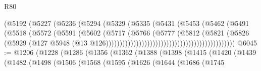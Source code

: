 \begin{lexlean}{R80}
\begin{coremodule}
                                                    (@5192
                                                      (@5227
                                                        (@5236
                                                          (@5294
                                                            (@5329
                                                              (@5335
                                                                (@5431
                                                                  (@5453
                                                                    (@5462
                                                                      (@5491
                                                                        (@5518
                                                                          (@5572
                                                                            (@5591
                                                                              (@5602
                                                                                (@5717
                                                                                  (@5766
                                                                                    (@5777
                                                                                      (@5812
                                                                                        (@5821
                                                                                          (@5826
                                                                                            (@5929
                                                                                              (@127
                                                                                                @5948
                                                                                                (@13
                                                                                                  @126)))))))))))))))))))))))))))))))))))))))))))))))
@6045 := @1206
    (@1228
      (@1286
        (@1356
          (@1362
            (@1388
              (@1398
                (@1415
                  (@1420
                    (@1439
                      (@1482
                        (@1498
                          (@1506
                            (@1568
                              (@1595
                                (@1626
                                  (@1644
                                    (@1686
                                      (@1745

\end{coremodule}
\end{lexlean}

